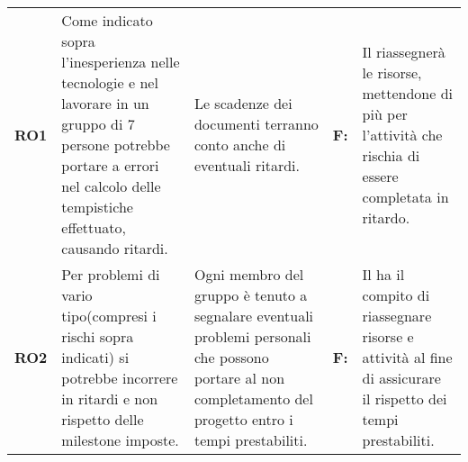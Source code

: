 {\begin{longtable}{C{2.5cm} C{3.25cm} C{3.25cm} C{1.5cm} C{3cm}}
\textbf{RO1} & 
Come indicato sopra l'inesperienza nelle tecnologie e nel lavorare in un gruppo di 7 persone potrebbe portare a errori nel calcolo delle tempistiche effettuato, causando ritardi. & 
Le scadenze dei documenti terranno conto anche di eventuali ritardi. &
\textbf{F:}  &
Il \respProg{} riassegnerà le risorse, mettendone di più per l'attività che rischia di essere completata in ritardo.\\

\textbf{RO2} & 
Per problemi di vario tipo(compresi i rischi sopra indicati) si potrebbe incorrere in ritardi e non rispetto delle milestone imposte. & 
Ogni membro del gruppo è tenuto a segnalare eventuali problemi personali che possono portare al non completamento del progetto entro i tempi prestabiliti. &
\textbf{F:}  &
Il \respProg{}ha il compito di riassegnare risorse e attività al fine di assicurare il rispetto dei tempi prestabiliti. \\


		
\end{longtable}
}
